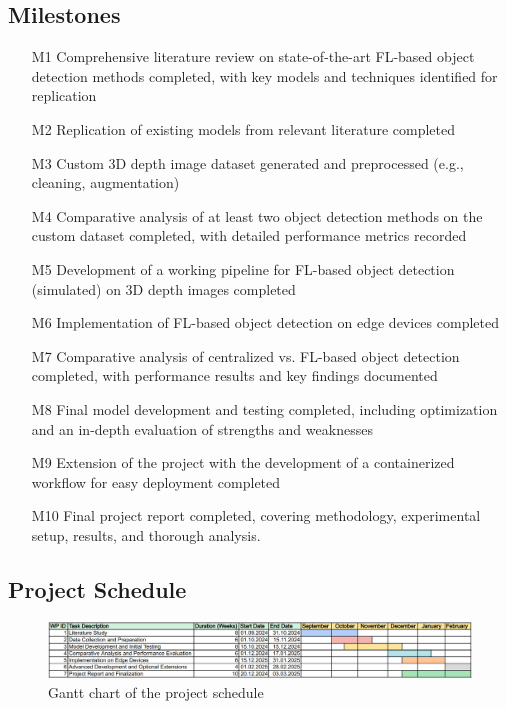 \documentclass[thesis]{mas_proposal}
\begin{document}
\subsection{Milestones}
  \begin{enumerate}
      \item[M1] Comprehensive literature review on state-of-the-art FL-based object detection methods completed, with key models and techniques identified for replication
      \item[M2] Replication of existing models from relevant literature completed
      \item[M3] Custom 3D depth image dataset generated and preprocessed (e.g., cleaning, augmentation)
      \item[M4] Comparative analysis of at least two object detection methods on the custom dataset completed, with detailed performance metrics recorded
      \item[M5] Development of a working pipeline for FL-based object detection (simulated) on 3D depth images completed
      \item[M6] Implementation of FL-based object detection on edge devices completed
      \item[M7] Comparative analysis of centralized vs. FL-based object detection completed, with performance results and key findings documented
      \item[M8] Final model development and testing completed, including optimization and an in-depth evaluation of strengths and weaknesses
      \item[M9] Extension of the project with the development of a containerized workflow for easy deployment completed
      \item[M10] Final project report completed, covering methodology, experimental setup, results, and thorough analysis.
  \end{enumerate}

\newpage
\subsection{Project Schedule}

\begin{figure}[h!]
      \hspace{-4em}
      \includegraphics[scale=0.3]{images/Gantt_chart.png}
      \caption{Gantt chart of the project schedule}
      \label{fig:myfigure}
\end{figure}
\end{document}
